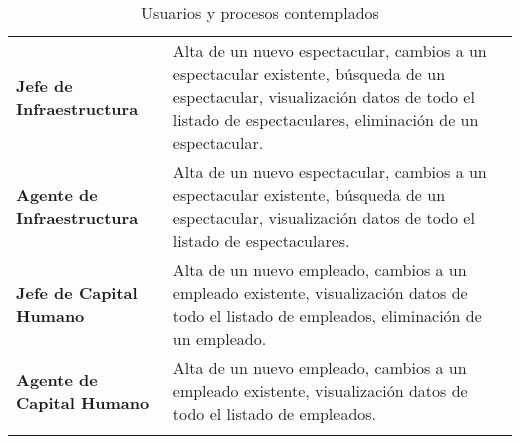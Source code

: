 \begin{longtable}[H]{m{4cm}m{8cm}}
    \textbf{Jefe de Infraestructura} & Alta de un nuevo espectacular, cambios a un espectacular existente, búsqueda de un espectacular, visualización datos de todo el listado de espectaculares, eliminación de un espectacular.\tabularnewline
    \textbf{Agente de Infraestructura} & Alta de un nuevo espectacular, cambios a un espectacular existente, búsqueda de un espectacular, visualización datos de todo el listado de espectaculares.\tabularnewline
    \textbf{Jefe de Capital Humano} & Alta de un nuevo empleado, cambios a un empleado existente, visualización datos de todo el listado de empleados, eliminación de un empleado.\tabularnewline
    \textbf{Agente de Capital Humano} & Alta de un nuevo empleado, cambios a un empleado existente, visualización datos de todo el listado de empleados. \tabularnewline

\caption{Usuarios y procesos contemplados}
\label{tbl:listaUP}
\bottomrule
\end{longtable}